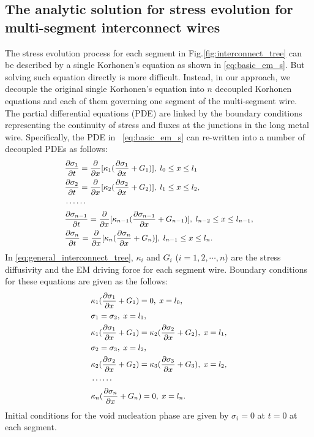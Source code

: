 \subsection{The analytic solution for stress evolution for multi-segment interconnect wires}
The stress evolution process for each segment in
Fig.\ref{fig:interconnect_tree} can be described by a single
Korhonen's equation as shown in \eqref{eq:basic_em_s}. But solving
such equation directly is more difficult.  Instead, in our approach,
we decouple the original single Korhonen's equation into $n$ decoupled
Korhonen equations and each of them governing one segment of the
multi-segment wire. The partial differential equations (PDE) are
linked by the boundary conditions representing the continuity of
stress and fluxes at the junctions in the long metal
wire. Specifically, the PDE in ~\eqref{eq:basic_em_s} can re-written
into a number of decoupled PDEs as follows:
\begin{equation} \label{eq:general_interconnect_tree}\small
\begin{split}
&\frac{\partial \sigma_1}{\partial t}=\frac{\partial }{\partial
x}[\kappa_1(\frac{\partial \sigma_1}{\partial x}+G_1)],\;l_0\leq x \leq l_1 \\
&\frac{\partial \sigma_2}{\partial t}=\frac{\partial }{\partial
x}[\kappa_2(\frac{\partial \sigma_2}{\partial
x}+G_2)],\;l_1\leq x \leq l_2, \\
&\cdots\cdots\\
&\frac{\partial \sigma_{n-1}}{\partial t}=\frac{\partial }{\partial
x}[\kappa_{n-1}(\frac{\partial \sigma_{n-1}}{\partial
x}+G_{n-1})],\;l_{n-2}\leq x \leq l_{n-1}, \\
&\frac{\partial \sigma_{n}}{\partial t}=\frac{\partial }{\partial
x}[\kappa_{n}(\frac{\partial \sigma_{n}}{\partial
x}+G_{n})],\;l_{n-1}\leq x \leq l_n.
 \end{split}
 \end{equation}
 In \eqref{eq:general_interconnect_tree}, $\kappa_{i}$ and $G_i$
 ($i=1,2,\cdots,n$) are the stress diffusivity and the EM driving
 force for each segment wire. Boundary conditions for these equations
 are given as the follows:
 \begin{equation} \label{bc:general_interconnect_tree}\small
\begin{split}
&\kappa_1(\frac{\partial \sigma_1}{\partial x}+G_1)=0,\;x=l_0,\\
&\sigma_1=\sigma_2,\;x=l_1,\\
&\kappa_1(\frac{\partial \sigma_1}{\partial
x}+G_1)=\kappa_2(\frac{\partial \sigma_2}{\partial
x}+G_2),\;x=l_1,\\
&\sigma_2=\sigma_3,\;x=l_2,\\
&\kappa_2(\frac{\partial \sigma_2}{\partial
x}+G_2)=\kappa_3(\frac{\partial \sigma_3}{\partial
x}+G_3),\;x=l_2,\\
&\cdots\cdots \\
&\kappa_n(\frac{\partial \sigma_n}{\partial
x}+G_n)=0,\;x=l_n.
 \end{split}
 \end{equation}
 Initial conditions for the void nucleation phase are given by
 $\sigma_i=0$ at $t=0$ at each segment.

